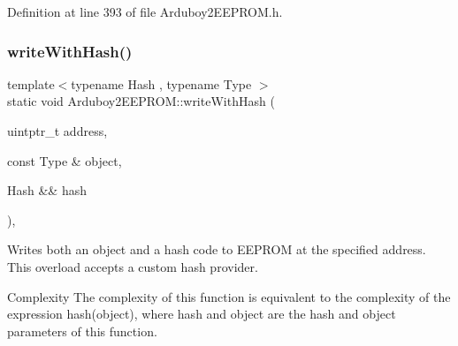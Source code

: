 Definition at line 393 of file Arduboy2\+E\+E\+P\+R\+O\+M.\+h.

\mbox{\label{classArduboy2EEPROM_a40f0abec863d2772e8da19d3cf37e980}} 
\subsubsection{\texorpdfstring{writeWithHash()}{writeWithHash()}\hspace{0.1cm}{\footnotesize\ttfamily [2/2]}}
{\footnotesize\ttfamily template$<$typename Hash , typename Type $>$ \\
static void Arduboy2\+E\+E\+P\+R\+O\+M\+::write\+With\+Hash (\begin{DoxyParamCaption}\item[{uintptr\+\_\+t}]{address,  }\item[{const Type \&}]{object,  }\item[{Hash \&\&}]{hash }\end{DoxyParamCaption})\hspace{0.3cm}{\ttfamily [inline]}, {\ttfamily [static]}}



Writes both an object and a hash code to E\+E\+P\+R\+OM at the specified address. This overload accepts a custom hash provider. 

\begin{DoxyParagraph}{Complexity}
The complexity of this function is equivalent to the complexity of the expression {\ttfamily hash(object)}, where {\ttfamily hash} and {\ttfamily object} are the {\ttfamily hash} and {\ttfamily object} parameters of this function.
\end{DoxyParagraph}

